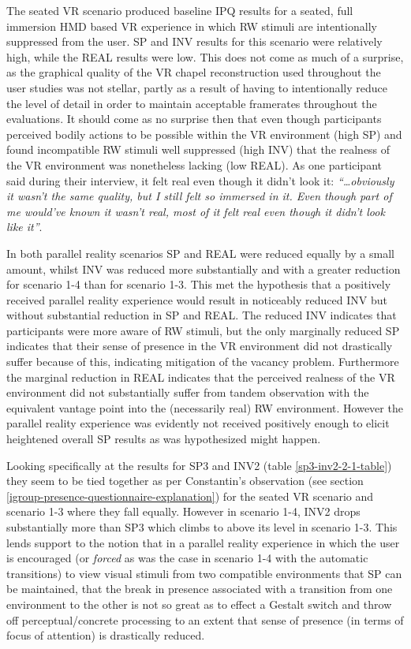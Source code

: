 The seated VR scenario produced baseline IPQ results for a seated, full immersion HMD based VR experience in which RW stimuli are intentionally suppressed from the user. SP and INV results for this scenario were relatively high, while the REAL results were low. This does not come as much of a surprise, as the graphical quality of the VR chapel reconstruction used throughout the user studies was not stellar, partly as a result of having to intentionally reduce the level of detail in order to maintain acceptable framerates throughout the evaluations. It should come as no surprise then that even though participants perceived bodily actions to be possible within the VR environment (high SP) and found incompatible RW stimuli well suppressed (high INV) that the realness of the VR environment was nonetheless lacking (low REAL). As one participant said during their interview, it felt real even though it didn't look it: \textit{``\ldots obviously it wasn't the same quality, but I still felt so immersed in it. Even though part of me would've known it wasn't real, most of it felt real even though it didn't look like it''}.

In both parallel reality scenarios SP and REAL were reduced equally by a small amount, whilst INV was reduced more substantially and with a greater reduction for scenario 1-4 than for scenario 1-3. This met the hypothesis that a positively received parallel reality experience would result in noticeably reduced INV but without substantial reduction in SP and REAL. The reduced INV indicates that participants were more aware of RW stimuli, but the only marginally reduced SP indicates that their sense of presence in the VR environment did not drastically suffer because of this, indicating mitigation of the vacancy problem. Furthermore the marginal reduction in REAL indicates that the perceived realness of the VR environment did not substantially suffer from tandem observation with the equivalent vantage point into the (necessarily real) RW environment. However the parallel reality experience was evidently not received positively enough to elicit heightened overall SP results as was hypothesized might happen.

Looking specifically at the results for SP3 and INV2 (table \ref{sp3-inv2-2-1-table}) they seem to be tied together as per Constantin's observation (see section \ref{igroup-presence-questionnaire-explanation}) for the seated VR scenario and scenario 1-3 where they fall equally. However in scenario 1-4, INV2 drops substantially more than SP3 which climbs to above its level in scenario 1-3. This lends support to the notion that in a parallel reality experience in which the user is encouraged (or \textit{forced} as was the case in scenario 1-4 with the automatic transitions) to view visual stimuli from two compatible environments that SP can be maintained, that the break in presence associated with a transition from one environment to the other is not so great as to effect a Gestalt switch and throw off perceptual/concrete processing to an extent that sense of presence (in terms of focus of attention) is drastically reduced.

